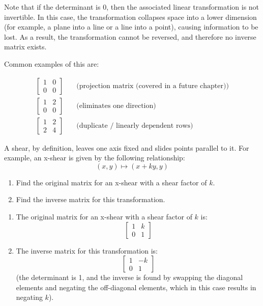 Note that if the determinant is $0$, then the associated linear transformation is not invertible. In this case, the transformation collapses space into a lower dimension (for example, a plane into a line or a line into a point), causing information to be lost. As a result, the transformation cannot be reversed, and therefore no inverse matrix exists.

Common examples of this are:

\[
\begin{aligned}
\begin{bmatrix}
1 & 0\\
0 & 0
\end{bmatrix}
&\quad \text{(projection matrix (covered in a future chapter))} \\
\begin{bmatrix}
1 & 2\\
0 & 0
\end{bmatrix}
&\quad \text{(eliminates one direction)} \\
\begin{bmatrix}
1 & 2\\
2 & 4
\end{bmatrix}
&\quad \text{(duplicate / linearly dependent rows)}
\end{aligned}
\]

\begin{Exercise}[title={Undoing a Shear}, label={ex:undo_shear}]

A shear, by definition, leaves one axis fixed and slides points parallel to it. For example, an x-shear is given by the following relationship:
$$(x, y) \mapsto (x + ky, y)$$

\begin{enumerate}
    \item Find the original matrix for an x-shear with a shear factor of $k$.
    \item Find the inverse matrix for this transformation.
\end{enumerate}
\end{Exercise}

\begin{Answer}[ref={ex:undo_shear}]
    \begin{enumerate}
        \item The original matrix for an x-shear with a shear factor of $k$ is:
        $$\begin{bmatrix} 1 & k \\ 0 & 1 \end{bmatrix}$$
        \item The inverse matrix for this transformation is:
        $$\begin{bmatrix} 1 & -k \\ 0 & 1 \end{bmatrix}$$
        (the determinant is 1, and the inverse is found by swapping the diagonal elements and negating the off-diagonal elements, which in this case results in negating $k$).
    \end{enumerate}
\end{Answer}



